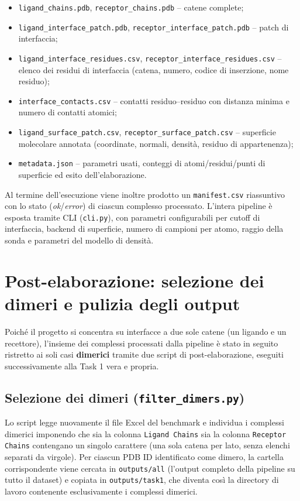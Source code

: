 \documentclass[11pt,a4paper]{article}
\begin{document}
\begin{itemize}
    \item \texttt{ligand\_chains.pdb}, \texttt{receptor\_chains.pdb} -- catene complete;
    \item \texttt{ligand\_interface\_patch.pdb}, \texttt{receptor\_interface\_patch.pdb} -- patch di interfaccia;
    \item \texttt{ligand\_interface\_residues.csv}, \texttt{receptor\_interface\_residues.csv} -- elenco dei residui di interfaccia (catena, numero, codice di inserzione, nome residuo);
    \item \texttt{interface\_contacts.csv} -- contatti residuo--residuo con distanza minima e numero di contatti atomici;
    \item \texttt{ligand\_surface\_patch.csv}, \texttt{receptor\_surface\_patch.csv} -- superficie molecolare annotata (coordinate, normali, densità, residuo di appartenenza);
    \item \texttt{metadata.json} -- parametri usati, conteggi di atomi/residui/punti di superficie ed esito dell'elaborazione.
\end{itemize}

Al termine dell'esecuzione viene inoltre prodotto un \texttt{manifest.csv} riassuntivo con lo stato (\emph{ok}/\emph{error}) di ciascun complesso processato. L'intera pipeline è esposta tramite CLI (\texttt{cli.py}), con parametri configurabili per cutoff di interfaccia, backend di superficie, numero di campioni per atomo, raggio della sonda e parametri del modello di densità.

\section{Post-elaborazione: selezione dei dimeri e pulizia degli output}
\label{sec:postproc}
Poiché il progetto si concentra su interfacce a due sole catene (un ligando e un recettore), l'insieme dei complessi processati dalla pipeline è stato in seguito ristretto ai soli casi \textbf{dimerici} tramite due script di post-elaborazione, eseguiti successivamente alla Task 1 vera e propria.

\subsection{Selezione dei dimeri (\texttt{filter\_dimers.py})}
Lo script legge nuovamente il file Excel del benchmark e individua i complessi dimerici imponendo che sia la colonna \texttt{Ligand Chains} sia la colonna \texttt{Receptor Chains} contengano un singolo carattere (una sola catena per lato, senza elenchi separati da virgole). Per ciascun PDB ID identificato come dimero, la cartella corrispondente viene cercata in \texttt{outputs/all} (l'output completo della pipeline su tutto il dataset) e copiata in \texttt{outputs/task1}, che diventa così la directory di lavoro contenente esclusivamente i complessi dimerici.
\end{document}
